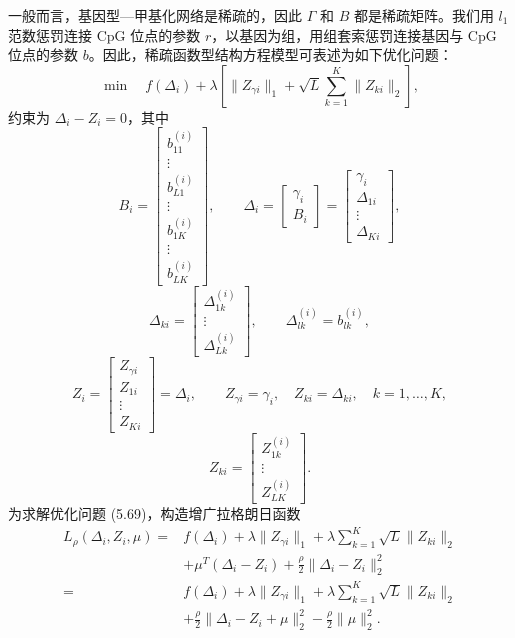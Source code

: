 一般而言，基因型—甲基化网络是稀疏的，因此 $\Gamma$ 和 $B$ 都是稀疏矩阵。我们用 $l_1$ 范数惩罚连接 CpG 位点的参数 $r$，以基因为组，用组套索惩罚连接基因与 CpG 位点的参数 $b$。因此，稀疏函数型结构方程模型可表述为如下优化问题：
\begin{equation}
\min\quad f(\Delta_i)+\lambda\left[\lVert Z_{\gamma i}\rVert_1
+\sqrt L\sum_{k=1}^K\lVert Z_{ki}\rVert_2\right],
\tag{5.69}
\end{equation}
约束为 $\Delta_i-Z_i=0$，其中
\[
B_i=\begin{bmatrix}b_{11}^{(i)}\\\vdots\\b_{L1}^{(i)}\\\vdots\\b_{1K}^{(i)}\\\vdots\\b_{LK}^{(i)}\end{bmatrix},\qquad
\Delta_i=\begin{bmatrix}\gamma_i\\B_i\end{bmatrix}
=\begin{bmatrix}\gamma_i\\\Delta_{1i}\\\vdots\\\Delta_{Ki}\end{bmatrix},
\]
\[
\Delta_{ki}=\begin{bmatrix}\Delta_{1k}^{(i)}\\\vdots\\\Delta_{Lk}^{(i)}\end{bmatrix},\qquad
\Delta_{lk}^{(i)}=b_{lk}^{(i)},
\]
\[
Z_i=\begin{bmatrix}Z_{\gamma i}\\Z_{1i}\\\vdots\\Z_{Ki}\end{bmatrix}=\Delta_i,\qquad
Z_{\gamma i}=\gamma_i,\quad Z_{ki}=\Delta_{ki},\quad k=1,\ldots,K,
\]
\[
Z_{ki}=\begin{bmatrix}Z_{1k}^{(i)}\\\vdots\\Z_{LK}^{(i)}\end{bmatrix}.
\]
为求解优化问题 (5.69)，构造增广拉格朗日函数
\begin{equation}
\begin{aligned}
L_\rho(\Delta_i,Z_i,\mu)
={}&f(\Delta_i)+\lambda\lVert Z_{\gamma i}\rVert_1
+\lambda\sum_{k=1}^K\sqrt L\lVert Z_{ki}\rVert_2\\
&+\mu^T(\Delta_i-Z_i)+\frac\rho2\lVert\Delta_i-Z_i\rVert_2^2\\
={}&f(\Delta_i)+\lambda\lVert Z_{\gamma i}\rVert_1
+\lambda\sum_{k=1}^K\sqrt L\lVert Z_{ki}\rVert_2\\
&+\frac\rho2\lVert\Delta_i-Z_i+\mu\rVert_2^2-\frac\rho2\lVert\mu\rVert_2^2.
\end{aligned}
\tag{5.70}
\end{equation}
